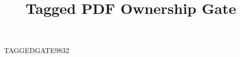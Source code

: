 \documentclass{tnqjournal}
\title{Tagged PDF Ownership Gate}
\begin{document}
\maketitle
TAGGEDGATE9832
\end{document}
